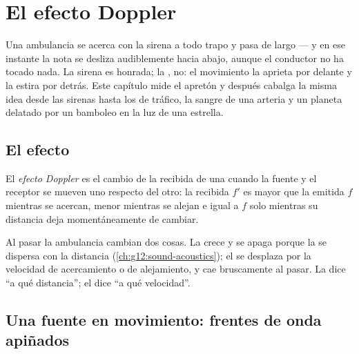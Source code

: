 \chapter{El efecto Doppler}\label{ch:g12:doppler-effect}

Una ambulancia se acerca con la sirena a todo trapo y pasa de largo ---
y en ese instante la nota se desliza audiblemente hacia abajo, aunque el
conductor no ha tocado nada. La sirena es honrada; la , no: el
movimiento la aprieta por delante y la estira por detrás. Este capítulo
mide el apretón y después cabalga la misma idea desde las sirenas hasta
los  de tráfico, la sangre de una arteria y un planeta delatado
por un bamboleo en la luz de una estrella.

\section{El efecto}

\begin{definition}\label{def:g12:doppler-effect:doppler}
El \emph{efecto Doppler} es el cambio de la
 recibida de una  cuando la fuente y el receptor se mueven
uno respecto del otro: la  recibida $f'$ es mayor que la
emitida $f$ mientras se acercan, menor mientras se alejan e igual a $f$
solo mientras su distancia deja momentáneamente de cambiar.
\end{definition}

\begin{remark}\label{rem:g12:doppler-effect:pitch}
Al pasar la ambulancia cambian dos cosas. La \emph{} crece y se
apaga porque la  se dispersa con la distancia
(\cref{ch:g12:sound-acoustics}); el \emph{} se desplaza por la
velocidad de acercamiento o de alejamiento, y cae bruscamente al pasar.
La  dice ``a qué distancia''; el  dice ``a qué
velocidad''.
\end{remark}

\section{Una fuente en movimiento: frentes de onda apiñados}

